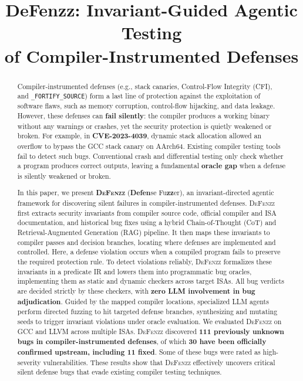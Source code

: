 \documentclass[conference,compsoc]{IEEEtran}
\begin{document}
\title{DeFenzz: Invariant-Guided Agentic Testing\\of Compiler-Instrumented Defenses}

\author{
}

\maketitle
\thispagestyle{plain} %
\pagestyle{plain}     %

\begin{abstract}
Compiler-instrumented defenses (e.g., stack canaries, Control-Flow Integrity (CFI), and \texttt{\_FORTIFY\_\allowbreak SOURCE}) form a last line of protection against the exploitation of software flaws, such as memory corruption, control-flow hijacking, and data leakage. However, these defenses can \textbf{fail silently}: the compiler produces a working binary without any warnings or crashes, yet the security protection is quietly weakened or broken. For example, in \textbf{CVE-2023-4039}, dynamic stack allocation allowed an overflow to bypass the GCC stack canary on AArch64. Existing compiler testing tools fail to detect such bugs. Conventional crash and differential testing only check whether a program produces correct outputs, leaving a fundamental \textbf{oracle gap} when a defense is silently weakened or broken.

In this paper, we present \textbf{\textsc{DeFenzz}} (\textbf{Defen}se Fu\textbf{zz}er), an invariant-directed agentic framework for discovering silent failures in compiler-instrumented defenses. \textsc{DeFenzz} first extracts security invariants from compiler source code, official compiler and ISA documentation, and historical bug fixes using a hybrid Chain-of-Thought (CoT) and Retrieval-Augmented Generation (RAG) pipeline. It then maps these invariants to compiler passes and decision branches, locating where defenses are implemented and controlled. Here, a defense violation occurs when a compiled program fails to preserve the required protection rule. To detect violations reliably, \textsc{DeFenzz} formalizes these invariants in a predicate IR and lowers them into programmatic bug oracles, implementing them as static and dynamic checkers across target ISAs. All bug verdicts are decided strictly by these checkers, with \textbf{zero LLM involvement in bug adjudication}. Guided by the mapped compiler locations, specialized LLM agents perform directed fuzzing to hit targeted defense branches, synthesizing and mutating seeds to trigger invariant violations under oracle evaluation. We evaluated \textsc{DeFenzz} on GCC and LLVM across multiple ISAs. \textsc{DeFenzz} discovered \textbf{111 previously unknown bugs in compiler-instrumented defenses}, of which \textbf{30 have been officially confirmed upstream, including 11 fixed}. Some of these bugs were rated as high-severity vulnerabilities. These results show that \textsc{DeFenzz} effectively uncovers critical silent defense bugs that evade existing compiler testing techniques.
\end{abstract}
\end{document}
